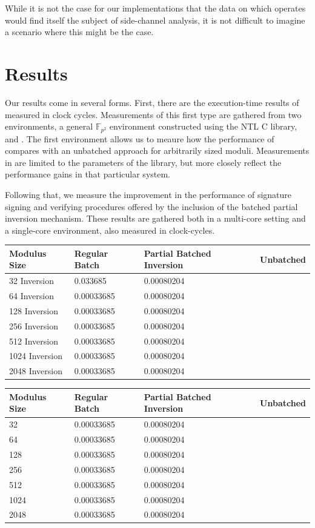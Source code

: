 While it is not the case for our implementations that the data on which  operates would find itself the subject of side-channel analysis, it is not difficult to imagine a scenario where this might be the case. 


\section{Results}

Our results come in several forms. First, there are the execution-time results of  measured in clock cycles. Measurements of this first type are gathered from two environments, a general $\mathbb{F}_{p^2}$ environment constructed using the NTL C library, and \sidh. The first environment allows us to meaure how the performance of  compares with an unbatched approach for arbitrarily sized moduli. Measurements in \sidh are limited to the parameters of the library, but more closely reflect the performance gains in that particular system.

Following that, we measure the improvement in the performance of signature signing and verifying procedures offered by the inclusion of the batched partial inversion mechanism. These results are gathered both in a multi-core setting and a single-core environment, also measured in clock-cycles.  


\begin{center}
\begin{tabular}{@{}llll@{}}
	\toprule
	Modulus Size & Regular Batch & Partial Batched Inversion & Unbatched \\
	\midrule
	32 Inversion & 0.033685 & 0.00080204\\
	64 Inversion & 0.00033685 & 0.00080204\\
	128 Inversion & 0.00033685 & 0.00080204\\
	256 Inversion & 0.00033685 & 0.00080204\\
	512 Inversion & 0.00033685 & 0.00080204\\
	1024 Inversion & 0.00033685 & 0.00080204\\
	2048 Inversion & 0.00033685 & 0.00080204\\
	\bottomrule
\end{tabular}
\end{center}

\begin{center}
\begin{tabular}{@{}llll@{}}
	\toprule
	Modulus Size & Regular Batch & Partial Batched Inversion & Unbatched \\
	\midrule
	32 & 0.00033685 & 0.00080204\\
	64 & 0.00033685 & 0.00080204\\
	128 & 0.00033685 & 0.00080204\\
	256 & 0.00033685 & 0.00080204\\
	512 & 0.00033685 & 0.00080204\\
	1024 & 0.00033685 & 0.00080204\\
	2048 & 0.00033685 & 0.00080204\\
	\bottomrule
\end{tabular}
\end{center}

